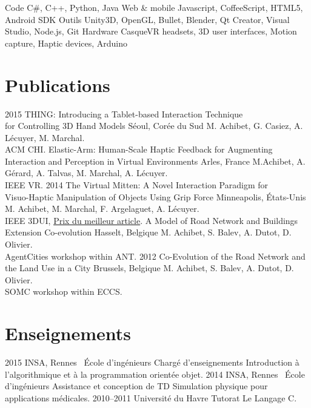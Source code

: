 \documentclass[]{friggeri-cv}
\begin{document}
\begin{entrylist}
	\entry
		{Code}
		{C\#, C++, Python, Java}
		{}
		{}
	\entry
		{Web \& mobile}
		{Javascript, CoffeeScript, HTML5, Android SDK}
		{}
		{}
	\entry
		{Outils}
		{Unity3D, OpenGL, Bullet, Blender, Qt Creator, Visual Studio, Node.js, Git}
		{}
		{}
	\entry
		{Hardware}
		{CasqueVR headsets, 3D user interfaces, Motion capture, Haptic devices, Arduino}
		{}
		{}
\end{entrylist}

\section{Publications}

\begin{entrylist}
  \entry
    {2015}
    {THING: Introducing a Tablet-based Interaction Technique\\ for Controlling 3D Hand Models}
    {Séoul, Corée du Sud}
    {M. Achibet, G. Casiez, A. Lécuyer, M. Marchal.\\ ACM CHI.}
  \entry
    {}
    {Elastic-Arm: Human-Scale Haptic Feedback for Augmenting\\ Interaction and Perception in Virtual Environments}
    {Arles, France}
    {M.Achibet, A. Gérard, A. Talvas, M. Marchal, A. Lécuyer.\\ IEEE VR.}
  \entry
    {2014}
    {The Virtual Mitten: A Novel Interaction Paradigm for\\ Visuo-Haptic Manipulation of Objects Using Grip Force}
    {Minneapolis, \'Etats-Unis}
    {M. Achibet, M. Marchal, F. Argelaguet, A. Lécuyer.\\ IEEE 3DUI, \underline{Prix du meilleur article}.}
  \entry
    {}
    {A Model of Road Network and Buildings Extension Co-evolution}
    {Hasselt, Belgique}
    {M. Achibet, S. Balev, A. Dutot, D. Olivier.\\ AgentCities workshop within ANT.}
  \entry
    {2012}
    {Co-Evolution of the Road Network and the Land Use in a City}
    {Brussels, Belgique}
    {M. Achibet, S. Balev, A. Dutot, D. Olivier.\\ SOMC workshop within ECCS.}
\end{entrylist}

\newpage

\section{Enseignements}

\begin{entrylist}
  \entry
    {2015}
    {INSA, Rennes \textemdash\ \'Ecole d'ingénieurs}
    {Chargé d'enseignements}
    {Introduction à l'algorithmique et à la programmation orientée objet.}
  \entry
    {2014}
    {INSA, Rennes \textemdash\ \'Ecole d'ingénieurs}
    {Assistance et conception de TD}
    {Simulation physique pour applications médicales.}
  \entry
    {2010–2011}
    {Université du Havre}
    {Tutorat}
    {Le Langage C.}
\end{entrylist}
\end{document}
